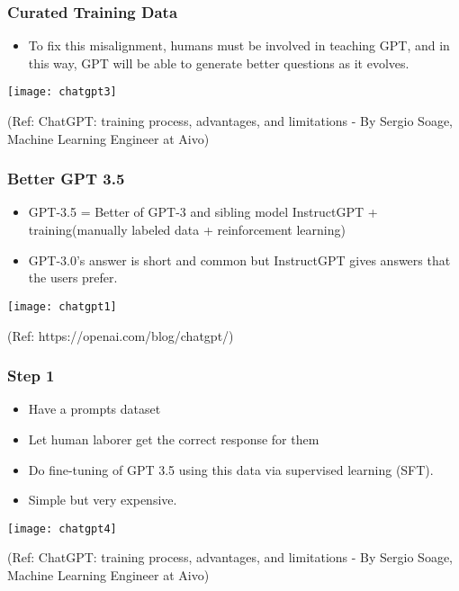 \begin{frame}[fragile]\frametitle{Curated Training Data}


\begin{itemize}
\item To fix this misalignment, humans must be involved in teaching GPT, and in this way, GPT will be able to generate better questions as it evolves.
\end{itemize}	 

			\begin{center}
			\texttt{[image: chatgpt3]}
			
			\end{center}		
			
			{\tiny (Ref: ChatGPT: training process, advantages, and limitations - By Sergio Soage, Machine Learning Engineer at Aivo)}
			
\end{frame}


\begin{frame}[fragile]\frametitle{Better GPT 3.5}

\begin{itemize}
\item GPT-3.5 = Better of GPT-3 and sibling model InstructGPT + training(manually labeled data + reinforcement learning)
\item GPT-3.0’s answer is short and common but InstructGPT gives answers that the users prefer.
\end{itemize}	 
			\begin{center}
			\texttt{[image: chatgpt1]}
			\end{center}		
			
			\tiny{(Ref: https://openai.com/blog/chatgpt/)}
\end{frame}

\begin{frame}[fragile]\frametitle{Step 1}

\begin{itemize}
\item Have a prompts dataset 
\item Let human laborer get the correct response for them
\item Do fine-tuning of GPT 3.5 using this data via supervised learning (SFT). 
\item Simple but very expensive.
\end{itemize}	 

			\begin{center}
			\texttt{[image: chatgpt4]}
			
			\end{center}		
			
			{\tiny (Ref: ChatGPT: training process, advantages, and limitations - By Sergio Soage, Machine Learning Engineer at Aivo)}
			
\end{frame}

